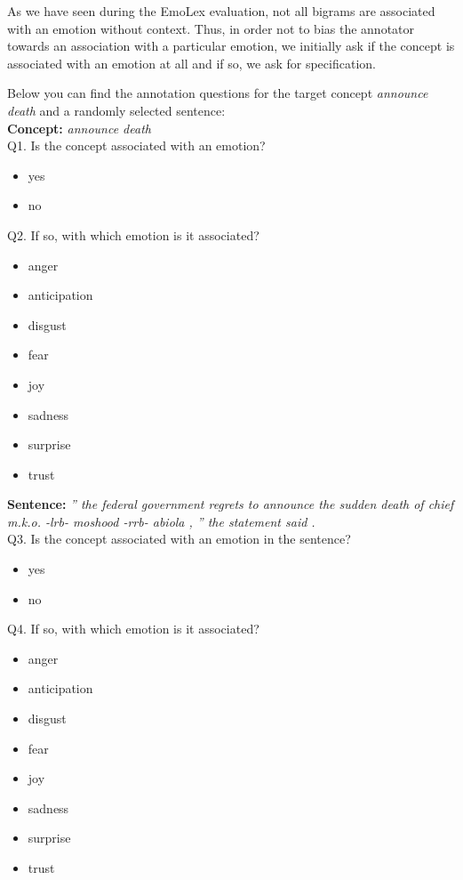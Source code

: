 As we have seen during the EmoLex evaluation, not all bigrams are associated with an emotion without context. Thus, in order not to bias the annotator towards an association with a particular emotion, we initially ask if the concept is associated with an emotion at all and if so, we ask for specification.

Below you can find the annotation questions for the target concept \textit{announce death} and a randomly selected sentence:\\

\textbf{Concept:} \textit{announce death}\\

Q1. Is the concept associated with an emotion?
\begin{itemize}[noitemsep]
	\item yes
	\item no
\end{itemize}

Q2. If so, with which emotion is it associated?
\begin{itemize}[noitemsep]
	\item anger
	\item anticipation
	\item disgust
	\item fear
	\item joy
	\item sadness
	\item surprise
	\item trust
\end{itemize}

\textbf{Sentence:} \textit{'' the federal government regrets to announce the sudden death of chief m.k.o. -lrb- moshood -rrb- abiola , '' the statement said .}\\

Q3. Is the concept associated with an emotion in the sentence?
\begin{itemize}[noitemsep]
	\item yes
	\item no
\end{itemize}

Q4. If so, with which emotion is it associated?
\begin{itemize}[noitemsep]
	\item anger
	\item anticipation
	\item disgust
	\item fear
	\item joy
	\item sadness
	\item surprise
	\item trust
\end{itemize}

